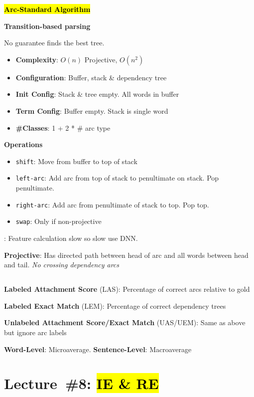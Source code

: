 \documentclass[8pt]{extarticle}
\renewcommand{\green}[1]{{\color{ForestGreen} #1}}
\newcommand{\greenbf}[1]{\textbf{\green{#1}}}
\newcommand{\redbf}[1]{\textbf{\red{#1}}}
\begin{document}
\begin{multicols}{3}
  \greenbf{\hl{Arc-Standard Algorithm}}

  \textbf{Transition-based parsing}

  No guarantee finds the best tree.

  \begin{itemize}
    \item \textbf{Complexity}: $O(n)$ Projective, $O(n^2)$
    \item \textbf{Configuration}: Buffer, stack \& dependency tree
    \item \textbf{Init Config}: Stack \& tree empty. All words in buffer
    \item \textbf{Term Config}: Buffer empty. Stack is single word
    \item \textbf{\#Classes}: 1 + 2 * \# arc type
  \end{itemize}

  \textbf{Operations}
  \begin{itemize}
    \item \texttt{shift}: Move from buffer to top of stack
    \item \texttt{left-arc}: Add arc from top of stack to penultimate on stack. Pop penultimate.
    \item \texttt{right-arc}: Add arc from penultimate of stack to top. Pop top.
    \item \texttt{swap}: Only if non-projective
  \end{itemize}

  \redbf{Problem}: Feature calculation slow so slow use DNN.

  \greenbf{Projective}: Has directed path between head of arc and all words between head and tail. \textit{No crossing dependency arcs}

  \subsection*{}

  \greenbf{Labeled Attachment Score} (LAS): Percentage of correct arcs relative to gold

  \greenbf{Labeled Exact Match} (LEM): Percentage of correct dependency trees

  \greenbf{Unlabeled Attachment Score/Exact Match} (UAS/UEM): Same as above but ignore arc labels

  \textbf{Word-Level}: Microaverage. \textbf{Sentence-Level}: Macroaverage

  \section*{Lecture~\#8: \hl{IE \& RE}}


\end{multicols}
\end{document}
